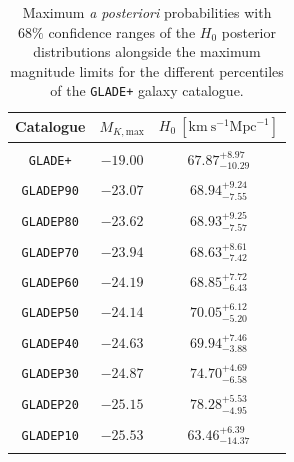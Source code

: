 \begin{table}
    \small
    \centering
    \caption[$H_0$ MAP values with $68\%$ confidence ranges, alongside the maximum magnitude limits for \texttt{GLADE+} and the different subsets.]{Maximum {\em a posteriori} probabilities with $68\%$ confidence ranges of the $H_0$ posterior distributions alongside the maximum magnitude limits for the different percentiles of the \texttt{GLADE+} galaxy catalogue.}
    \begin{tabular}{c c c }
    \hline
        \textbf{Catalogue} & $M_{K,\mathrm{max}}$ & $H_0~[\mathrm{km}~\mathrm{s}^{-1}\mathrm{Mpc}^{-1}]$ \\ \hline
        \\[-0.8em]
        \texttt{GLADE+} & $-19.00$ & $67.87^{+8.97}_{-10.29}$ \\ 
        \\[-0.8em]
        \texttt{GLADEP90} & $-23.07$ & $68.94^{+9.24}_{-7.55}$ \\
        \\[-0.8em]
        \texttt{GLADEP80} & $-23.62$ & $68.93^{+9.25}_{-7.57}$ \\
        \\[-0.8em]
        \texttt{GLADEP70} & $-23.94$ & $68.63^{+8.61}_{-7.42}$ \\
        \\[-0.8em]
        \texttt{GLADEP60} & $-24.19$ & $68.85^{+7.72}_{-6.43}$ \\
        \\[-0.8em]
        \texttt{GLADEP50} & $-24.14$ & $70.05^{+6.12}_{-5.20}$ \\
        \\[-0.8em]
        \texttt{GLADEP40} & $-24.63$ & $69.94^{+7.46}_{-3.88}$ \\
        \\[-0.8em]
        \texttt{GLADEP30} & $-24.87$ & $74.70^{+4.69}_{-6.58}$ \\
        \\[-0.8em]
        \texttt{GLADEP20} & $-25.15$ & $78.28^{+5.53}_{-4.95}$ \\
        \\[-0.8em]
        \texttt{GLADEP10} & $-25.53$ & $63.46^{+6.39}_{-14.37}$ \\ 
        \\[-0.8em]
        \hline
    \end{tabular}
    \label{tab:h0_stats}
\end{table}


